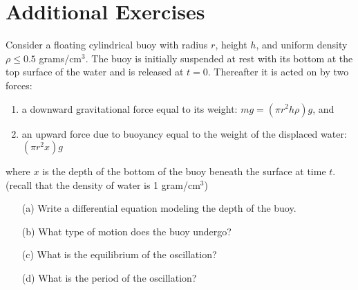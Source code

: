 \newpage\section{Additional Exercises}


\begin{problem}
\item Consider a floating cylindrical buoy with radius $r$, height $h$, and uniform
    density $\rho \le 0.5$ grams/cm$^3$.  The buoy is initially suspended at rest with
    its bottom at the top surface of the water and is released at $t=0$.  Thereafter
    it is acted on by two forces: 
    \begin{enumerate}
        \item a downward gravitational force equal to its weight: $mg = \left( \pi r^2 h
            \rho \right) g$, and
        \item an upward force due to buoyancy equal to the weight of the displaced water:
            $\left( \pi r^2 x\right) g$
    \end{enumerate}
    where $x$ is the depth of the bottom of the buoy beneath the surface at time $t$.
    (recall that the density of water is 1 gram/cm$^3$)
    \begin{itemize}
        \item[(a)] Write a differential equation modeling the depth of the buoy.
        \item[(b)] What type of motion does the buoy undergo?
        \item[(c)] What is the equilibrium of the oscillation?
        \item[(d)] What is the period of the oscillation?
    \end{itemize}
\end{problem}


